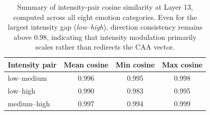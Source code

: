 \begin{table}[H]
\centering
\small
\begin{tabular}{lccc}
\toprule
\textbf{Intensity pair} &
  \textbf{Mean cosine} &
  \textbf{Min cosine} &
  \textbf{Max cosine} \\
\midrule
  low–medium & 0.996 & 0.995 & 0.998 \\
  low–high & 0.990 & 0.983 & 0.995 \\
  medium–high & 0.997 & 0.994 & 0.999 \\
\bottomrule
\end{tabular}
\caption{Summary of intensity-pair cosine similarity at Layer 13, computed across
         all eight emotion categories. Even for the largest intensity gap
         (\textit{low–high}), direction consistency remains above 0.98,
         indicating that intensity modulation primarily scales rather than
         redirects the CAA vector.}
\label{tab:intensity_consistency_L13}
\end{table}